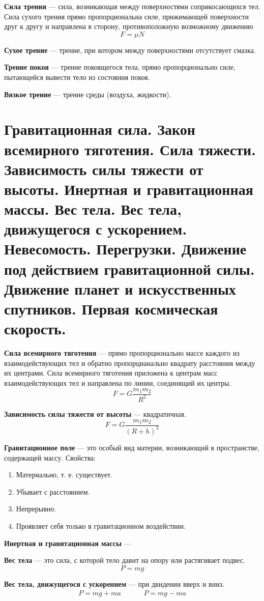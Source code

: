 \documentclass{report}
\begin{document}
{\bf Сила трения} ---
сила, возникающая между поверхностями соприкосающихся тел.
Сила сухого трения прямо пропорциональна силе, прижимающей 
поверхности друг к другу и направлена в сторону, противоположную возможному движению
$$
F=\mu N
$$

{\bf Сухое трение} ---
трение, при котором между поверхностями отсутствует смазка. 

{\bf Трение покоя} ---
трение покоящегося тела, прямо пропорционально силе, пытающейся вывести тело из состояния покоя.

{\bf Вязкое трение} ---
трение среды (воздуха, жидкости).



\part{Гравитационная сила. 
Закон всемирного тяготения. 
Сила тяжести. 
Зависимость силы тяжести от высоты. 
Инертная и гравитационная массы. 
Вес тела. 
Вес тела, движущегося с ускорением. 
Невесомость. 
Перегрузки. 
Движение под действием гравитационной силы. 
Движение планет и искусственных спутников. 
Первая космическая скорость. }

{\bf Сила всемирного тяготения} ---
прямо пропорционально массе каждого из взаимодействующих тел и обратно пропорцианально квадрату
расстояния между их центрами. Сила всемирного тяготения приложена к центрам масс взаимодействующих
тел и направлена по линии, соединящий их центры.
$$
F=G\frac{m_1m_2}{R^2}
$$ 

{\bf Зависимость силы тяжести от высоты} ---
квадратичная.
$$
F=G\frac{m_1m_2}{(R+h)^2}
$$

{\bf Гравитационное поле} ---
это особый вид материи, возникающий в пространстве, содержащей массу. Свойства:
\begin{enumerate}
  \item Материально, т. е. существует.
  \item Убывает с расстоянием.
  \item Непрерывно.
  \item Проявляет себя только в гравитационном воздействии.
\end{enumerate}

{\bf Инертная и гравитационная массы} ---

{\bf Вес тела} ---
это сила, с которой тело давит на опору или растягивает подвес.
$$
P=mg
$$

{\bf Вес тела, движущегося с ускорением} ---
при двидении вверх и вниз.
$$
  \begin{array}{ccccc}
    P=mg + ma &&&& P=mg-ma 
  \end{array}
$$
\end{document}

